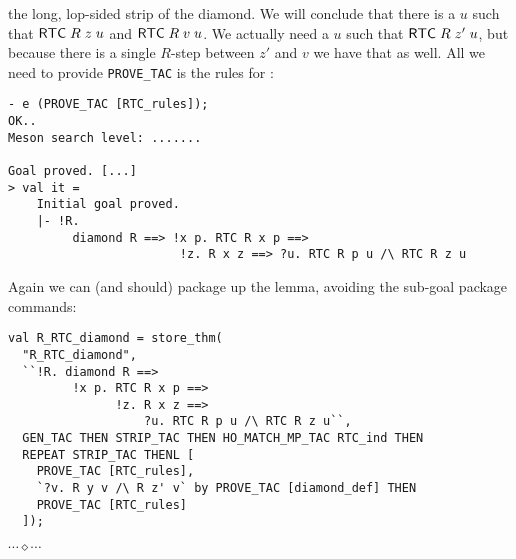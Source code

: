 \documentclass[12pt]{article}
\newcommand{\eos}{\hfill{}$\cdots\diamond\cdots$\hfill{}\vspace{5mm}}
\begin{document}
the long, lop-sided strip of the diamond.  We will conclude that there
is a $u$ such that ${\sf RTC}\;R\;z\;u$ and ${\sf RTC}\;R\;v\;u$.  We
actually need a $u$ such that ${\sf RTC}\;R\;z'\;u$, but because there
is a single $R$-step between $z'$ and $v$ we have that as well.  All
we need to provide \texttt{PROVE\_TAC} is the rules for :
\begin{session}\begin{verbatim}
- e (PROVE_TAC [RTC_rules]);
OK..
Meson search level: .......

Goal proved. [...]
> val it =
    Initial goal proved.
    |- !R.
         diamond R ==> !x p. RTC R x p ==>
                        !z. R x z ==> ?u. RTC R p u /\ RTC R z u
\end{verbatim}\end{session}
    Again we can (and should) package up the lemma, avoiding the
    sub-goal package commands:
\begin{session}\begin{verbatim}
val R_RTC_diamond = store_thm(
  "R_RTC_diamond",
  ``!R. diamond R ==>
         !x p. RTC R x p ==>
               !z. R x z ==>
                   ?u. RTC R p u /\ RTC R z u``,
  GEN_TAC THEN STRIP_TAC THEN HO_MATCH_MP_TAC RTC_ind THEN
  REPEAT STRIP_TAC THENL [
    PROVE_TAC [RTC_rules],
    `?v. R y v /\ R z' v` by PROVE_TAC [diamond_def] THEN
    PROVE_TAC [RTC_rules]
  ]);
\end{verbatim}\end{session}
\eos{}
\end{document}
